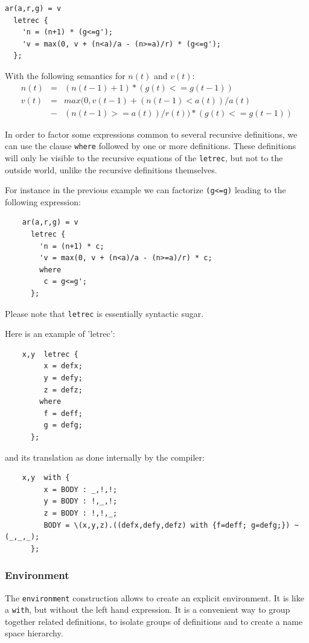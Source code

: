 \begin{lstlisting}
ar(a,r,g) = v
  letrec {
    'n = (n+1) * (g<=g');
    'v = max(0, v + (n<a)/a - (n>=a)/r) * (g<=g');
  };
\end{lstlisting}
With the following semantics for $n(t)$ and $v(t)$:
\begin{eqnarray*}
	n(t)&=&(n(t-1)+1) * (g(t) <= g(t-1))\\
	v(t)&=& max(0, v(t-1) + (n(t-1)<a(t))/a(t) \\
						  &-& (n(t-1)>=a(t))/r(t)) * (g(t)<=g(t-1))
\end{eqnarray*}

In order to factor some expressions common to several recursive definitions, we can use the clause \lstinline'where' followed by one or more definitions. These definitions will only be visible to the recursive equations of the \lstinline'letrec', but not to the outside world, unlike the recursive definitions themselves.

For instance in the previous example we can factorize \lstinline'(g<=g)' leading to the following expression:

\begin{lstlisting}
	ar(a,r,g) = v
	  letrec {
		'n = (n+1) * c;
		'v = max(0, v + (n<a)/a - (n>=a)/r) * c;
		where
		 c = g<=g';
	  };
\end{lstlisting}

Please note that \lstinline'letrec' is essentially syntactic sugar.

Here is an example of 'letrec':

\begin{lstlisting}
	x,y  letrec {
		 x = defx;
		 y = defy;
		 z = defz;
		where
		 f = deff;
		 g = defg;
	  };
\end{lstlisting}

and its translation as done internally by the compiler:

\begin{lstlisting}
	x,y  with {
		 x = BODY : _,!,!;
		 y = BODY : !,_,!;
		 z = BODY : !,!,_;
		 BODY = \(x,y,z).((defx,defy,defz) with {f=deff; g=defg;}) ~ (_,_,_);
	  };
\end{lstlisting}




\subsubsection{Environment}

The \lstinline'environment' construction allows to create an explicit environment. It is like a \lstinline'with', but without the left hand expression. It is a convenient way to group together related definitions, to isolate groups of definitions and to create a name space hierarchy. 

